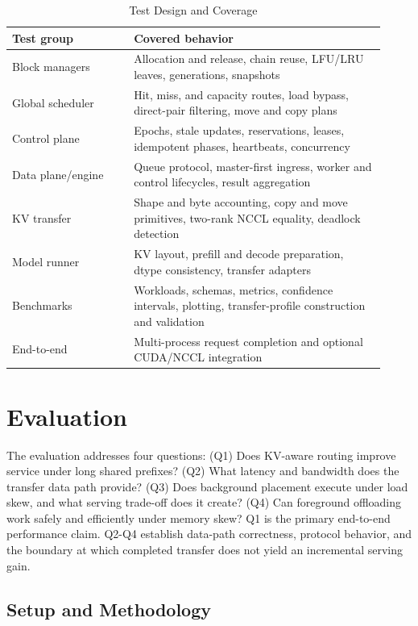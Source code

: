 \documentclass{article}
\begin{document}
\begin{table}[t]
  \centering
  \caption{Test Design and Coverage}
  \label{tab:tests}
  \footnotesize
  \setlength{\tabcolsep}{3.5pt}
  \begin{tabular}{@{}p{0.30\linewidth}p{0.62\linewidth}@{}}
    \toprule
    Test group & Covered behavior \\
    \midrule
    Block managers & Allocation and release, chain reuse, LFU/LRU leaves, generations, snapshots \\
    Global scheduler & Hit, miss, and capacity routes, load bypass, direct-pair filtering, move and copy plans \\
    Control plane & Epochs, stale updates, reservations, leases, idempotent phases, heartbeats, concurrency \\
    Data plane/engine & Queue protocol, master-first ingress, worker and control lifecycles, result aggregation \\
    KV transfer & Shape and byte accounting, copy and move primitives, two-rank NCCL equality, deadlock detection \\
    Model runner & KV layout, prefill and decode preparation, dtype consistency, transfer adapters \\
    Benchmarks & Workloads, schemas, metrics, confidence intervals, plotting, transfer-profile construction and validation \\
    End-to-end & Multi-process request completion and optional CUDA/NCCL integration \\
    \bottomrule
  \end{tabular}
\end{table}

\section{Evaluation}
\label{sec:eval}

The evaluation addresses four questions: (Q1) Does KV-aware routing improve service under long shared prefixes? (Q2) What latency and bandwidth does the transfer data path provide? (Q3) Does background placement execute under load skew, and what serving trade-off does it create? (Q4) Can foreground offloading work safely and efficiently under memory skew? Q1 is the primary end-to-end performance claim. Q2-Q4 establish data-path correctness, protocol behavior, and the boundary at which completed transfer does not yield an incremental serving gain.

\subsection{Setup and Methodology}
\end{document}
